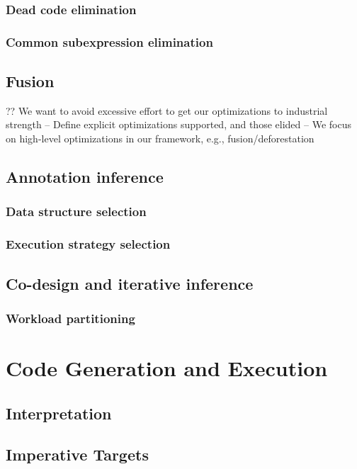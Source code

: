 \documentclass[10pt]{article}
\begin{document}
    \subsubsection{Dead code elimination}
    \subsubsection{Common subexpression elimination}

  \subsection{Fusion}

    ?? We want to avoid excessive effort to get our optimizations to industrial strength
      -- Define explicit optimizations supported, and those elided
      -- We focus on high-level optimizations in our framework, e.g., fusion/deforestation

  \subsection{Annotation inference}
    \subsubsection{Data structure selection}
    \subsubsection{Execution strategy selection}

  \subsection{Co-design and iterative inference}
    \subsubsection{Workload partitioning}

\section{Code Generation and Execution}
\subsection{Interpretation}

\subsection{Imperative Targets}
\end{document}
